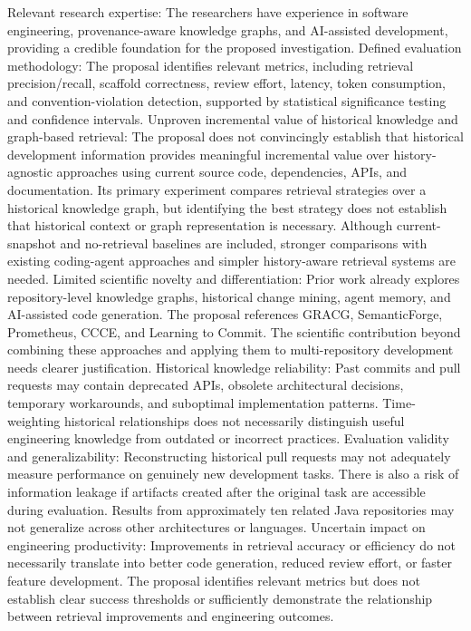 Relevant research expertise: The researchers have experience in software engineering, provenance-aware knowledge graphs, and AI-assisted development, providing a credible foundation for the proposed investigation.
Defined evaluation methodology: The proposal identifies relevant metrics, including retrieval precision/recall, scaffold correctness, review effort, latency, token consumption, and convention-violation detection, supported by statistical significance testing and confidence intervals.
Unproven incremental value of historical knowledge and graph-based retrieval: The proposal does not convincingly establish that historical development information provides meaningful incremental value over history-agnostic approaches using current source code, dependencies, APIs, and documentation. Its primary experiment compares retrieval strategies over a historical knowledge graph, but identifying the best strategy does not establish that historical context or graph representation is necessary. Although current-snapshot and no-retrieval baselines are included, stronger comparisons with existing coding-agent approaches and simpler history-aware retrieval systems are needed.
Limited scientific novelty and differentiation: Prior work already explores repository-level knowledge graphs, historical change mining, agent memory, and AI-assisted code generation. The proposal references GRACG, SemanticForge, Prometheus, CCCE, and Learning to Commit. The scientific contribution beyond combining these approaches and applying them to multi-repository development needs clearer justification.
Historical knowledge reliability: Past commits and pull requests may contain deprecated APIs, obsolete architectural decisions, temporary workarounds, and suboptimal implementation patterns. Time-weighting historical relationships does not necessarily distinguish useful engineering knowledge from outdated or incorrect practices.
Evaluation validity and generalizability: Reconstructing historical pull requests may not adequately measure performance on genuinely new development tasks. There is also a risk of information leakage if artifacts created after the original task are accessible during evaluation. Results from approximately ten related Java repositories may not generalize across other architectures or languages.
Uncertain impact on engineering productivity: Improvements in retrieval accuracy or efficiency do not necessarily translate into better code generation, reduced review effort, or faster feature development. The proposal identifies relevant metrics but does not establish clear success thresholds or sufficiently demonstrate the relationship between retrieval improvements and engineering outcomes.
